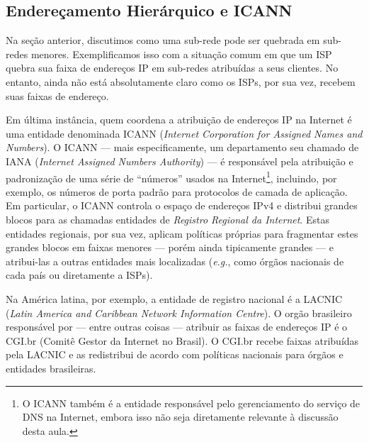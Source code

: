 \documentclass{article}
\begin{document}
\subsection{Endereçamento Hierárquico e ICANN}

Na seção anterior, discutimos como uma sub-rede pode ser quebrada em sub-redes menores. Exemplificamos isso com a situação comum em que um ISP quebra sua faixa de endereços IP em sub-redes atribuídas a seus clientes. No entanto, ainda não está absolutamente claro como os ISPs, por sua vez, recebem suas faixas de endereço. 

Em última instância, quem coordena a atribuição de endereços IP na Internet é uma entidade denominada ICANN (\textit{Internet Corporation for Assigned Names and Numbers}). O ICANN --- mais especificamente, um departamento seu chamado de IANA (\textit{Internet Assigned Numbers Authority}) --- é responsável pela atribuição e padronização de uma série de ``números'' usados na Internet\footnote{O ICANN também é a entidade responsável pelo gerenciamento do serviço de DNS na Internet, embora isso não seja diretamente relevante à discussão desta aula.}, incluindo, por exemplo, os números de porta padrão para protocolos de camada de aplicação. Em particular, o ICANN controla o espaço de endereços IPv4 e distribui grandes blocos para as chamadas entidades de \textit{Registro Regional da Internet}. Estas entidades regionais, por sua vez, aplicam políticas próprias para fragmentar estes grandes blocos em faixas menores --- porém ainda tipicamente grandes --- e atribui-las a outras entidades mais localizadas (\textit{e.g.}, como órgãos nacionais de cada país ou diretamente a ISPs). 

Na América latina, por exemplo, a entidade de registro nacional é a LACNIC (\textit{Latin America and Caribbean Network Information Centre}). O orgão brasileiro responsável por --- entre outras coisas --- atribuir as faixas de endereços IP é o CGI.br (Comitê Gestor da Internet no Brasil). O CGI.br recebe faixas atribuídas pela LACNIC e as redistribui de acordo com políticas nacionais para órgãos e entidades brasileiras.
\end{document}
